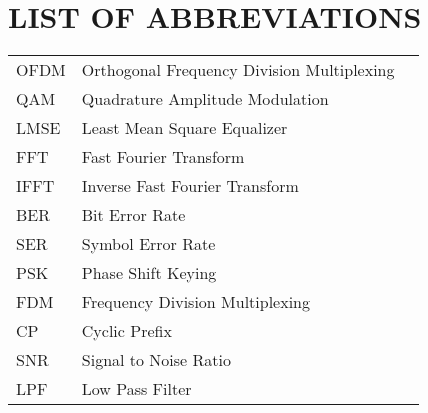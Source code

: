 \section*{LIST OF ABBREVIATIONS}
 {}

\begin{tabularx}{0.9\textwidth}{ L{0.4} L{1.3} L{1.3} }
    OFDM    & Orthogonal Frequency Division Multiplexing \\
    QAM     & Quadrature Amplitude Modulation \\
    LMSE    & Least Mean Square Equalizer \\ %
    FFT     & Fast Fourier Transform \\
    IFFT    & Inverse Fast Fourier Transform \\
    BER     & Bit Error Rate \\
    SER     & Symbol Error Rate \\
    PSK     & Phase Shift Keying \\
    FDM     & Frequency Division Multiplexing \\
    CP      & Cyclic Prefix \\
    SNR     & Signal to Noise Ratio \\
    LPF     & Low Pass Filter \\
\end{tabularx}

\newpage